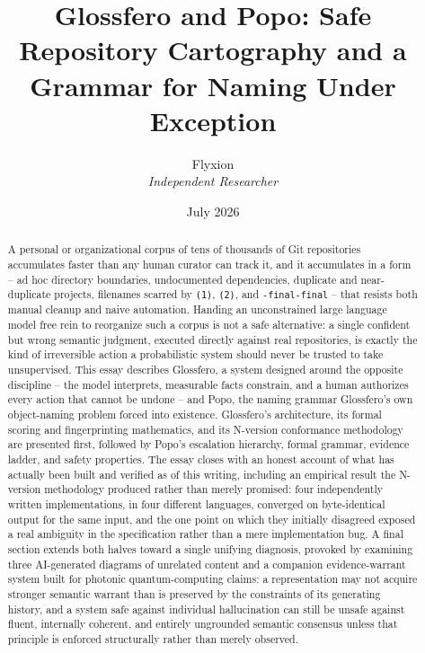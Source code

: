 \documentclass[11pt]{article}
\title{Glossfero and Popo: Safe Repository Cartography and a Grammar for Naming Under Exception}
\author{Flyxion \\ \textit{Independent Researcher}}
\date{July 2026}
\begin{document}
\maketitle

\begin{abstract}
A personal or organizational corpus of tens of thousands of Git repositories accumulates faster than any human curator can track it, and it accumulates in a form -- ad hoc directory boundaries, undocumented dependencies, duplicate and near-duplicate projects, filenames scarred by \texttt{(1)}, \texttt{(2)}, and \texttt{-final-final} -- that resists both manual cleanup and naive automation. Handing an unconstrained large language model free rein to reorganize such a corpus is not a safe alternative: a single confident but wrong semantic judgment, executed directly against real repositories, is exactly the kind of irreversible action a probabilistic system should never be trusted to take unsupervised. This essay describes Glossfero, a system designed around the opposite discipline -- the model interprets, measurable facts constrain, and a human authorizes every action that cannot be undone -- and Popo, the naming grammar Glossfero's own object-naming problem forced into existence. Glossfero's architecture, its formal scoring and fingerprinting mathematics, and its N-version conformance methodology are presented first, followed by Popo's escalation hierarchy, formal grammar, evidence ladder, and safety properties. The essay closes with an honest account of what has actually been built and verified as of this writing, including an empirical result the N-version methodology produced rather than merely promised: four independently written implementations, in four different languages, converged on byte-identical output for the same input, and the one point on which they initially disagreed exposed a real ambiguity in the specification rather than a mere implementation bug. A final section extends both halves toward a single unifying diagnosis, provoked by examining three AI-generated diagrams of unrelated content and a companion evidence-warrant system built for photonic quantum-computing claims: a representation may not acquire stronger semantic warrant than is preserved by the constraints of its generating history, and a system safe against individual hallucination can still be unsafe against fluent, internally coherent, and entirely ungrounded semantic consensus unless that principle is enforced structurally rather than merely observed.
\end{abstract}
\end{document}
